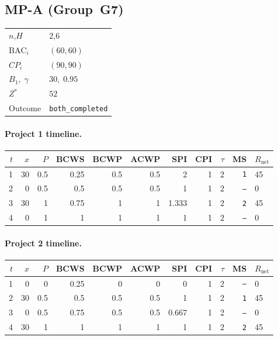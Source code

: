 \documentclass[12pt, a4paper]{article}
\newcommand{\BAC}{\mathrm{BAC}}
\begin{document}
\newpage

\subsection*{MP-A  (Group~G7)}
\begin{center}
\begin{tabular}{ll}
\toprule
$n$,\;$H$ & $2$,\;$6$ \\
$\BAC_i$ & $(60, 60)$ \\
$CP_i$   & $(90, 90)$ \\
$B_1,\;\gamma$ & $30,\;0.95$ \\
$Z^*$ & $52$ \\
Outcome & \texttt{both_completed} \\
\bottomrule
\end{tabular}
\end{center}

\paragraph{Project 1 timeline.}
\begin{center}
\begin{tabular}{rrrrrrrrrrl}
\toprule
$t$ & $x$ & $P$ & BCWS & BCWP & ACWP & SPI & CPI & $\tau$ & MS & $R_{\mathrm{net}}$\\
\midrule
1 & 30 & 0.5 & 0.25 & 0.5 & 0.5 & 2 & 1 & 2 & \texttt{1} & 45 \\
2 & 0 & 0.5 & 0.5 & 0.5 & 0.5 & 1 & 1 & 2 & \texttt{---} & 0 \\
3 & 30 & 1 & 0.75 & 1 & 1 & 1.333 & 1 & 2 & \texttt{2} & 45 \\
4 & 0 & 1 & 1 & 1 & 1 & 1 & 1 & 2 & \texttt{---} & 0 \\
\bottomrule
\end{tabular}
\end{center}
\paragraph{Project 2 timeline.}
\begin{center}
\begin{tabular}{rrrrrrrrrrl}
\toprule
$t$ & $x$ & $P$ & BCWS & BCWP & ACWP & SPI & CPI & $\tau$ & MS & $R_{\mathrm{net}}$\\
\midrule
1 & 0 & 0 & 0.25 & 0 & 0 & 0 & 1 & 2 & \texttt{---} & 0 \\
2 & 30 & 0.5 & 0.5 & 0.5 & 0.5 & 1 & 1 & 2 & \texttt{1} & 45 \\
3 & 0 & 0.5 & 0.75 & 0.5 & 0.5 & 0.667 & 1 & 2 & \texttt{---} & 0 \\
4 & 30 & 1 & 1 & 1 & 1 & 1 & 1 & 2 & \texttt{2} & 45 \\
\bottomrule
\end{tabular}
\end{center}
\end{document}

